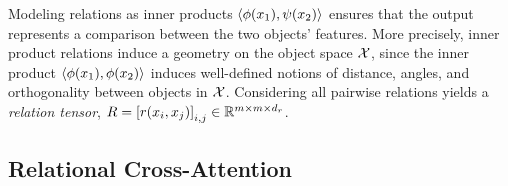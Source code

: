 
Modeling relations as inner products $\left \langle \phi(x_1), \psi(x_2) \right\rangle$ ensures that the output represents a comparison between the two objects' features. More precisely, inner product relations induce a geometry on the object space ${\mathcal{X}}$, since the inner product $\left \langle \phi(x_1), \phi(x_2) \right\rangle$ induces well-defined notions of distance, angles, and orthogonality between objects in ${\mathcal{X}}$. %
Considering all pairwise relations yields a \textit{relation tensor}, $R = \left[r(x_i, x_j)\right]_{i,j} \in \mathbb{R}^{m \times m \times d_r}$.
\subsection{Relational Cross-Attention}\label{ssec:relational_crossattention}

